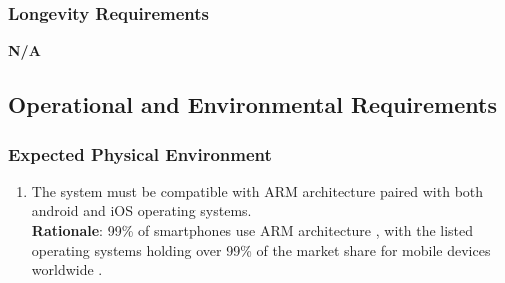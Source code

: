 \subsubsection{Longevity Requirements}
\label{ssub:longevity_requirements}
\textbf{N/A}


\subsection{Operational and Environmental Requirements}
\label{sub:operational_and_environmental_requirements}

\subsubsection{Expected Physical Environment}
\label{ssub:expected_physical_environment}
\begin{enumerate}[{OE-EPE}1. ]
	\item The system must be compatible with ARM architecture paired with both android and iOS operating systems.
	\\ \textbf{Rationale}: 99\% of smartphones use ARM architecture \cite{ARM2025}, with the listed operating systems holding over 99\% of the market share for mobile devices worldwide \cite{Backlinko2025}.
\end{enumerate}


